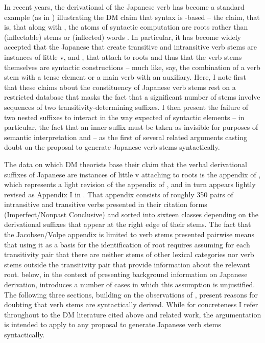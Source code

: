 \documentclass[output=paper,
modfonts
]{LSP/langsci}
\begin{document}
In recent years, the derivational  of the Japanese verb has
become a standard example (as in \citealt{harley2012a}) illustrating the DM claim
that syntax is -based -- the claim, that is, that along with
, the atoms of syntactic computation are roots
rather than (inflectable) stems or (inflected) words \citep[5]{embick2008a}. In particular, it has become widely accepted \citep[106]{marantz2013a}
that the Japanese  that create transitive and intransitive verb
stems are instances of little v,  and , that attach
to roots and thus that the verb stems themselves are syntactic
constructions -- much like, say, the combination of a verb stem with a
tense element or a main verb with an auxiliary. Here, I note first that
these claims about the constituency of Japanese verb stems rest on a
restricted database that masks the fact that a significant number of
stems involve sequences of two transitivity-determining suffixes. I then
present the failure of two nested suffixes to interact in the way
expected of syntactic elements -- in particular, the fact that an inner
suffix must be taken as invisible for purposes of semantic
interpretation and  -- as the first of several related
arguments casting doubt on the proposal to generate Japanese verb stems
syntactically.

The data on which DM theorists base their claim that the verbal
derivational  suffixes of Japanese are instances of little v attaching to
roots is the appendix of \citet{jacobsen1992a}, which represents a light
revision of the appendix of \citet{jacobsen1982a}, and in turn appears lightly
revised as Appendix I in \citet{volpe2005a}. That appendix consists of roughly
350 pairs of  intransitive and transitive verbs presented in
their citation forms (Imperfect/Nonpast Conclusive) and sorted into
sixteen classes depending on the derivational suffixes that appear at
the right edge of their stems. The fact that the Jacobsen/Volpe appendix
is limited to verb stems presented pairwise means that using it as a
basis for the identification of root requires assuming for each
transitivity pair that there are neither stems of other lexical
categories nor verb stems outside the transitivity pair that provide
information about the relevant root.  below, in the context of
presenting background information on Japanese derivation, introduces a
number of cases in which this assumption is unjustified. The following
three sections, building on the observations of , present
reasons for doubting that verb stems are syntactically derived. While
for concreteness I refer throughout to the DM literature cited above and
related work, the argumentation is intended to apply to any proposal to
generate Japanese verb stems syntactically.
\end{document}
